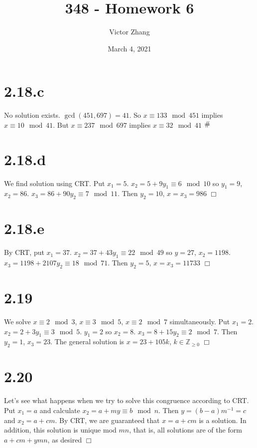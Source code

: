 \documentclass{article}
\title{348 - Homework 6}
\author{Victor Zhang}
\date{March 4, 2021}
\newcommand{\contra}{\raisebox{\depth}{\#}}
\begin{document}
\maketitle

\section*{2.18.c}
No solution exists. $\gcd(451,697) = 41$. So $x \equiv 133 \mod 451$ implies $x \equiv 10 \mod 41$. But $x \equiv 237 \mod 697$ implies $x \equiv 32 \mod 41$ $\contra$

\section*{2.18.d}
We find solution using CRT. Put $x_1 = 5$. $x_2 = 5 + 9y_1 \equiv 6 \mod 10$ so $y_1 = 9$, $x_2 = 86$. $x_3 = 86 + 90y_2 \equiv 7 \mod 11$. Then $y_2 = 10$, $x = x_3 = 986$ $\Box$

\section*{2.18.e}
By CRT, put $x_1 = 37$. $x_2 = 37 + 43y_1 \equiv 22 \mod 49$ so $y = 27$, $x_2 = 1198$. $x_3 = 1198 + 2107y_2 \equiv 18 \mod 71$. Then $y_2 = 5$, $x = x_3 = 11733$ $\Box$

\section*{2.19}
We solve $x \equiv 2 \mod 3$, $x \equiv 3 \mod 5$, $x \equiv 2 \mod 7$ simultaneously. Put $x_1 = 2$. $x_2 = 2 + 3y_1 \equiv 3 \mod 5$. $y_1 = 2$ so $x_2 = 8$. $x_3 = 8 + 15y_2 \equiv 2 \mod 7$. Then $y_2 = 1$, $x_3 = 23$. The general solution is $x = 23 + 105k$, $k \in \mathbb{Z}_{\geqslant 0}$ $\Box$

\section*{2.20}
Let's see what happens when we try to solve this congruence according to CRT. Put $x_1 = a$ and calculate $x_2 = a + my \equiv b \mod n$. Then $y = (b-a)m^{-1} = c$ and $x_2 = a + cm$. By CRT, we are guaranteed that $x = a + cm$ is a solution. In addition, this solution is unique mod $mn$, that is, all solutions are of the form $a + cm + ymn$, as desired $\Box$
\end{document}
